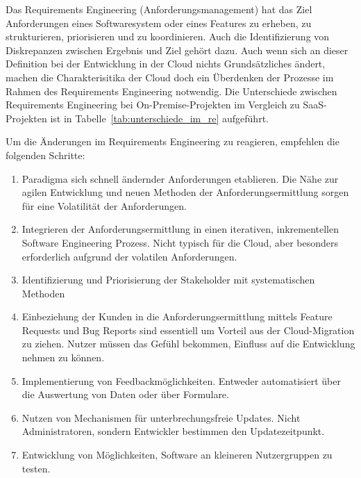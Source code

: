 Das Requirements Engineering (Anforderungsmanagement) hat das Ziel 
Anforderungen eines Softwaresystem oder eines Features zu erheben, zu 
strukturieren, priorisieren und zu 
koordinieren.  Auch die 
Identifizierung von Diskrepanzen zwischen Ergebnis und Ziel gehört dazu. 
 Auch wenn sich 
an dieser Definition bei der Entwicklung in der Cloud nichts Grundsätzliches 
ändert, machen die Charakterisitika der Cloud doch ein Überdenken der Prozesse 
im Rahmen des Requirements Engineering notwendig. 
Die Unterschiede zwischen Requirements Engineering bei On-Premise-Projekten im 
Vergleich zu SaaS-Projekten ist in Tabelle~\ref{tab:unterschiede_im_re} 
aufgeführt.


Um die Änderungen im Requirements Engineering zu reagieren, empfehlen 
 die folgenden Schritte:
\begin{enumerate}
	\item Paradigma sich schnell ändernder Anforderungen etablieren. Die 
Nähe zur agilen Entwicklung und neuen Methoden der Anforderungsermittlung 
sorgen für eine Volatilität der Anforderungen.
	\item Integrieren der Anforderungsermittlung in einen iterativen, 
inkrementellen Software Engineering Prozess. Nicht typisch für die Cloud, aber 
besonders erforderlich aufgrund der volatilen Anforderungen.
	\item Identifizierung und Priorisierung der Stakeholder mit 
systematischen Methoden
	\item Einbeziehung der Kunden in die Anforderungsermittlung mittels 
Feature Requests und Bug Reports sind essentiell um Vorteil aus der 
Cloud-Migration zu ziehen. Nutzer müssen das Gefühl bekommen, Einfluss auf die 
Entwicklung nehmen zu können.
	\item Implementierung von Feedbackmöglichkeiten. Entweder automatisiert 
über die Auswertung von Daten oder über Formulare. 
	\item Nutzen von Mechanismen für unterbrechungsfreie Updates. Nicht 
Administratoren, sondern Entwickler bestimmen den Updatezeitpunkt.
	\item Entwicklung von Möglichkeiten, Software an kleineren 
Nutzergruppen zu testen.
\end{enumerate}


